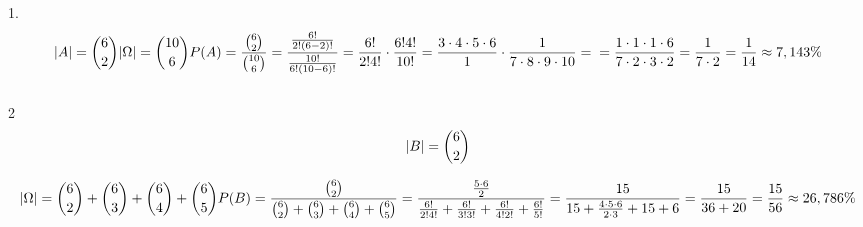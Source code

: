 \medskip
{} 
\medskip

1.\\
$$
|A| = {6\choose2}\\
|\Omega| = {10\choose 6}\\
P(A) = \frac{{6\choose2}}{{10\choose 6}} = \frac{\frac{6!}{2!(6-2)!}}{\frac{10!}{6!(10-6)!}}
= \frac{6!}{2!4!}\cdot\frac{6!4!}{10!} = \frac{3\cdot4\cdot5\cdot6}{1}\cdot\frac{1}{7\cdot8\cdot9\cdot10}=\\
=\frac{1\cdot1\cdot1\cdot6}{7\cdot2\cdot3\cdot2}=\frac{1}{7\cdot2}=\frac{1}{14}\approx7,143\%
\\
$$
\\2\\
$$
|B|={6\choose2}\\
$$

$$
|\Omega|={6\choose2}+{6\choose3}+{6\choose4}+{6\choose5}\\

P(B) = \frac{{6\choose2}}{{6\choose2}+{6\choose3}+{6\choose4}+{6\choose5}}=
\frac{\frac{5\cdot6}{2}}{\frac{6!}{2!4!}+\frac{6!}{3!3!}+\frac{6!}{4!2!}+\frac{6!}{5!}}=\\
\frac{15}{15+\frac{4\cdot5\cdot6}{2\cdot3}+15+6}
=\frac{15}{36+20}=\frac{15}{56}\approx26,786\%
$$
